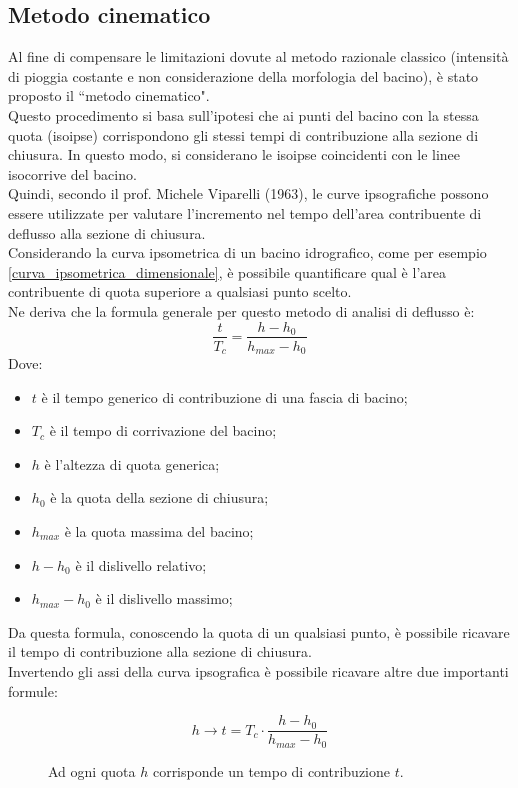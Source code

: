 \subsection{Metodo cinematico}
Al fine di compensare le limitazioni dovute al metodo razionale classico (intensità di pioggia costante e non considerazione della morfologia del bacino), è stato proposto il ``metodo cinematico".\\
Questo procedimento si basa sull'ipotesi che ai punti del bacino con la stessa quota (isoipse) corrispondono gli stessi tempi di contribuzione alla sezione di chiusura. In questo modo, si considerano le isoipse coincidenti con le linee isocorrive del bacino.\\
Quindi, secondo il prof. Michele Viparelli (1963), le curve ipsografiche possono essere utilizzate per valutare l'incremento nel tempo dell'area contribuente di deflusso alla sezione di chiusura.\\
Considerando la curva ipsometrica di un bacino idrografico, come per esempio \ref{curva_ipsometrica_dimensionale}, è possibile quantificare qual è l'area contribuente di quota superiore a qualsiasi punto scelto.\\
Ne deriva che la formula generale per questo metodo di analisi di deflusso è:
\begin{equation}
    \frac{t}{T_c} = \frac{h - h_0}{h_{max} - h_0}
    \label{formula_generica_metodo_cinematico}
\end{equation}
Dove:
\begin{itemize}
    \item $t$ è il tempo generico di contribuzione di una fascia di bacino;
    \item $T_c$ è il tempo di corrivazione del bacino;
    \item $h$ è l'altezza di quota generica;
    \item $h_0$ è la quota della sezione di chiusura;
    \item $h_{max}$ è la quota massima del bacino;
    \item $h - h_0$ è il dislivello relativo;
    \item $h_{max}-h_0$ è il dislivello massimo;
\end{itemize}
Da questa formula, conoscendo la quota di un qualsiasi punto, è possibile ricavare il tempo di contribuzione alla sezione di chiusura.\\
Invertendo gli assi della curva ipsografica è possibile ricavare altre due importanti formule:

\begin{figure}[H]
\begin{equation}
    h \rightarrow t= T_c \cdot \frac{h - h_0}{h_{max} - h_0}
    \label{h_tcontribuzione}
\end{equation}
\caption*{Ad ogni quota $h$ corrisponde un tempo di contribuzione $t$.}
\end{figure}

